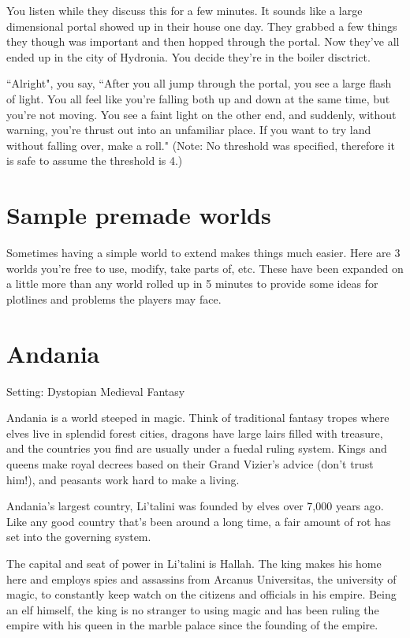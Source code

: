You listen while they discuss this for a few minutes. It sounds like a large
dimensional portal showed up in their house one day. They grabbed a few things
they though was important and then hopped through the portal. Now they've all
ended up in the city of Hydronia. You decide they're in the boiler disctrict.

``Alright", you say, ``After you all jump through the portal, you see a large
flash of light. You all feel like you're falling both up and down at the same
time, but you're not moving. You see a faint light on the other end, and
suddenly, without warning, you're thrust out into an unfamiliar place. If you
want to try land without falling over, make a roll." (Note: No threshold was
specified, therefore it is safe to assume the threshold is 4.)

\section*{Sample premade worlds}

Sometimes having a simple world to extend makes things much easier. Here are
3 worlds you're free to use, modify, take parts of, etc. These have been
expanded on a little more than any world rolled up in 5 minutes to provide
some ideas for plotlines and problems the players may face.

\section*{Andania}

Setting: Dystopian Medieval Fantasy

Andania is a world steeped in magic. Think of traditional fantasy tropes where
elves live in splendid forest cities, dragons have large lairs filled with
treasure, and the countries you find are usually under a fuedal ruling system.
Kings and queens make royal decrees based on their Grand Vizier's advice (don't
trust him!), and peasants work hard to make a living.

Andania's largest country, Li'talini was founded by elves over 7,000 years ago.
Like any good country that's been around a long time, a fair amount of rot has
set into the governing system.

The capital and seat of power in Li'talini is Hallah. The king makes his home
here and employs spies and assassins from Arcanus Universitas, the university
of magic, to constantly keep watch on the citizens and officials in his empire.
Being an elf himself, the king is no stranger to using magic and has been
ruling the empire with his queen in the marble palace since the founding of
the empire.

